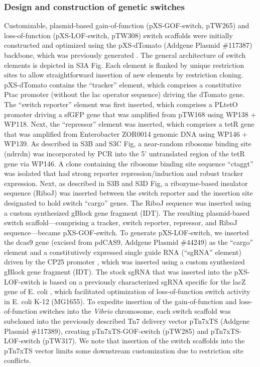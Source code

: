 \subsubsection{Design and construction of genetic switches}
Customizable, plasmid-based gain-of-function (pXS-GOF-switch, pTW265) and loss-of-function (pXS-LOF-switch, pTW308) switch scaffolds were initially constructed and optimized using the pXS-dTomato (Addgene Plasmid \#117387) backbone, which was previously generated \cite{wiles_modernized_2018}. The general architecture of switch elements is depicted in S3A Fig. Each element is flanked by unique restriction sites to allow straightforward insertion of new elements by restriction cloning. pXS-dTomato contains the ``tracker'' element, which comprises a constitutive Ptac promoter (without the lac operator sequence) \cite{wiles_modernized_2018} driving the dTomato gene. The ``switch reporter'' element was first inserted, which comprises a PLtetO promoter \cite{lutz_independent_1997} driving a sfGFP gene that was amplified from pTW168 using WP138 + WP118. Next, the ``repressor'' element was inserted, which comprises a tetR gene that was amplified from Enterobacter ZOR0014 genomic DNA using WP146 + WP139. As described in S3B and S3C Fig, a near-random ribosome binding site (ndrrdn) was incorporated by PCR into the 5' untranslated region of the tetR gene via WP146. A clone containing the ribosome binding site sequence ``ctaggt'' was isolated that had strong reporter repression/induction and robust tracker expression. Next, as described in S3B and S3D Fig, a ribozyme-based insulator sequence (RiboJ) \cite{lou_ribozyme-based_2012} was inserted between the switch reporter and the insertion site designated to hold switch ``cargo'' genes. The RiboJ sequence was inserted using a custom synthesized gBlock gene fragment (IDT). The resulting plasmid-based switch scaffold—comprising a tracker, switch reporter, repressor, and RiboJ sequence—became pXS-GOF-switch. To generate pXS-LOF-switch, we inserted the dcas9 gene \cite{qi_repurposing_2013} (excised from pdCAS9, Addgene Plasmid \#44249) as the ``cargo'' element and a constitutively expressed single guide RNA (``sgRNA'' element) driven by the CP25 promoter \cite{jensen_sequence_1998}, which was inserted using a custom synthesized gBlock gene fragment (IDT). The stock sgRNA that was inserted into the pXS-LOF-switch is based on a previously characterized sgRNA specific for the lacZ gene of E. coli \cite{qi_repurposing_2013}, which facilitated optimization of loss-of-function switch activity in E. coli K-12 (MG1655). To expedite insertion of the gain-of-function and loss-of-function switches into the \textit{Vibrio} chromosome, each switch scaffold was subcloned into the previously described Tn7 delivery vector pTn7xTS (Addgene Plasmid \#117389), creating pTn7xTS-GOF-switch (pTW285) and pTn7xTS-LOF-switch (pTW317). We note that insertion of the switch scaffolds into the pTn7xTS vector limits some downstream customization due to restriction site conflicts.

